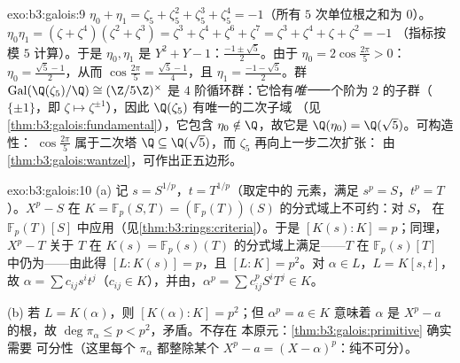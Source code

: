 \begin{solution}{exo:b3:galois:9}
$\eta_0 + \eta_1 = \zeta_5 + \zeta_5^2 + \zeta_5^3 + \zeta_5^4 =
-1$（所有 $5$ 次单位根之和为 $0$）。$\eta_0\eta_1 =
(\zeta + \zeta^4)(\zeta^2 + \zeta^3) = \zeta^3 + \zeta^4 +
\zeta^6 + \zeta^7 = \zeta^3 + \zeta^4 + \zeta + \zeta^2 = -1$
（指标按模 $5$ 计算）。于是 $\eta_0, \eta_1$ 是 $Y^2 + Y
- 1$：$\frac{-1 \pm \sqrt5}2$。由于 $\eta_0 =
2\cos\frac{2\pi}5 > 0$：$\eta_0 = \frac{\sqrt5 - 1}2$，从而
$\cos\frac{2\pi}5 = \frac{\sqrt5 - 1}4$，且 $\eta_1 =
\frac{-1-\sqrt5}2$。群
$\operatorname{Gal}(\Q(\zeta_5)/\Q) \cong (\Z/5\Z)^\times$ 是
$4$ 阶循环群：它恰有\emph{唯一}一个阶为
$2$ 的子群（$\{\pm 1\}$，即 $\zeta \mapsto \zeta^{\pm1}$），因此
$\Q(\zeta_5)$ 有唯一的二次子域
（见\cref{thm:b3:galois:fundamental}），它包含 $\eta_0
\notin \Q$，故它是 $\Q(\eta_0) = \Q(\sqrt5)$。可构造性：
$\cos\frac{2\pi}5$ 属于二次塔 $\Q \subseteq
\Q(\sqrt5)$，而 $\zeta_5$ 再向上一步二次扩张：
由\cref{thm:b3:galois:wantzel}，可作出正五边形。
\end{solution}

\begin{solution}{exo:b3:galois:10}
(a) 记 $s = S^{1/p}$，$t = T^{1/p}$（取定中的
元素，满足 $s^p = S$，$t^p = T$）。$X^p - S$ 在
$K = \mathbb F_p(S, T) = (\mathbb
F_p(T))(S)$ 的分式域上不可约：对 $S$，
在 $\mathbb F_p(T)[S]$ 中应用（见\cref{thm:b3:rings:criteria}）。于是
$[K(s):K] = p$；同理，$X^p - T$ 关于 $T$ 在
$K(s) = \mathbb F_p(s)(T)$ 的分式域上满足——$T$ 在
$\mathbb F_p(s)[T]$ 中仍为——由此得 $[L : K(s)] = p$，且 $[L:K] =
p^2$。对 $\alpha \in L$，$L = K[s, t]$，故 $\alpha = \sum
c_{ij}s^it^j$（$c_{ij} \in K$），并由，$\alpha^p = \sum c_{ij}^p S^iT^j \in K$。

(b) 若 $L = K(\alpha)$，则 $[K(\alpha):K] = p^2$；但
$\alpha^p = a \in K$ 意味着 $\alpha$ 是 $X^p - a$ 的根，故
$\deg\pi_\alpha \leq p < p^2$，矛盾。不存在
本原元：\cref{thm:b3:galois:primitive} 确实需要
可分性（这里每个 $\pi_\alpha$ 都整除某个 $X^p - a =
(X - \alpha)^p$：纯不可分）。
\end{solution}

